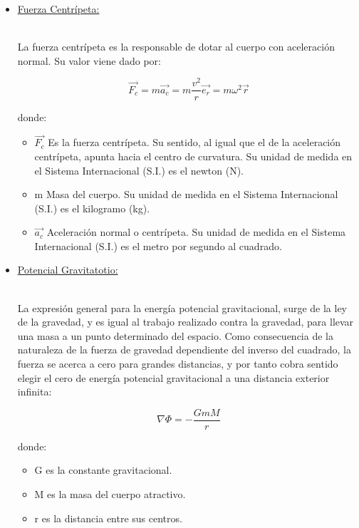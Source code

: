 \documentclass[letterpaper,12pt]{article}
\begin{document}
\begin{itemize}
{\begin{itemize}
\end{itemize}
     }

    \item[\Plane]\large{\underline{Fuerza Centrípeta:}}\\\\
    \small{La fuerza centrípeta es la responsable de dotar al cuerpo con aceleración normal. Su valor viene dado por:

    $$\vec{F_c}=m\vec{a_c}= m \frac{v^2}{r}\vec{e_r}=m \omega^2\vec{r}$$

    donde:

\begin{itemize}
    \item $\vec{F_c}$ Es la fuerza centrípeta. Su sentido, al igual que el de la aceleración centrípeta, apunta hacia el centro de curvatura. Su unidad de medida en el Sistema Internacional (S.I.) es el newton (N).
    \item m Masa del cuerpo. Su unidad de medida en el Sistema Internacional (S.I.) es el kilogramo (kg).
    \item $\vec{a_c}$ Aceleración normal o centrípeta. Su unidad de medida en el Sistema Internacional (S.I.) es el metro por segundo al cuadrado.

\end{itemize}
    
    }

    \item[\Plane]\large{\underline{Potencial Gravitatotio:}}\\\\
    \small{La expresión general para la energía potencial gravitacional, surge de la ley de la gravedad, y es igual al trabajo realizado contra la gravedad, para llevar una masa a un punto determinado del espacio. Como consecuencia de la naturaleza de la fuerza de gravedad dependiente del inverso del cuadrado, la fuerza se acerca a cero para grandes distancias, y por tanto cobra sentido elegir el cero de energía potencial gravitacional a una distancia exterior infinita:

    $$\nabla \Phi=-\frac{GmM}{r}$$

    donde:
    
\begin{itemize}
    \item G es la constante gravitacional.
    \item  M es la masa del cuerpo atractivo.
    \item r es la distancia entre sus centros.


\end{itemize}}
\end{itemize}
\end{document}
